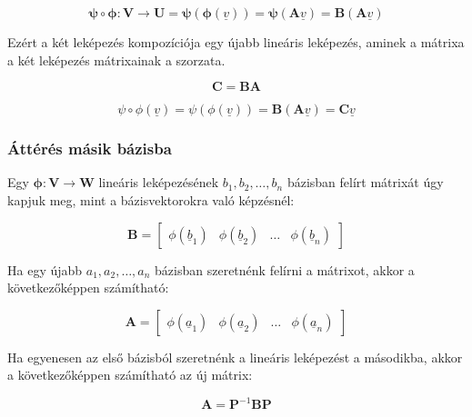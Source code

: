 \documentclass{article}
\begin{document}
\begin{equation*}
    \mathbf{\psi \circ \phi : V \rightarrow U} = \mathbf{\psi}(\mathbf{\phi}(\underline{v})) = \mathbf{\psi}(\mathbf{A}\underline{v}) = \mathbf{B}(\mathbf{A}\underline{v})
\end{equation*}

Ezért a két leképezés kompozíciója egy újabb lineáris leképezés, aminek a mátrixa a két leképezés mátrixainak a szorzata.

\begin{equation*}
    \mathbf{C} = \mathbf{B}\mathbf{A}
\end{equation*}

\begin{equation*}
    \psi \circ \phi(\underline{v}) = \psi(\phi(\underline{v})) = \mathbf{B}(\mathbf{A}\underline{v}) = \mathbf{C}\underline{v}  
\end{equation*}

\subsubsection{Áttérés másik bázisba}

Egy $\mathbf{\phi : V \rightarrow W}$ lineáris leképezésének $b_1,b_2,\ldots,b_n$ bázisban felírt mátrixát úgy kapjuk meg, mint a bázisvektorokra való képzésnél:

\begin{equation*}
    \mathbf{B} = \begin{bmatrix} \phi(\underline{b}_1) & \phi(\underline{b}_2) & \ldots & \phi(\underline{b}_n) \end{bmatrix}
\end{equation*}

Ha egy újabb $a_1, a_2, \ldots, a_n$ bázisban szeretnénk felírni a mátrixot, akkor a következőképpen számítható:

\begin{equation*}
    \mathbf{A} = \begin{bmatrix} \phi(\underline{a}_1) & \phi(\underline{a}_2) & \ldots & \phi(\underline{a}_n) \end{bmatrix}
\end{equation*}

Ha egyenesen az első bázisból szeretnénk a lineáris leképezést a másodikba, akkor a kö\-vet\-kez\-ő\-kép\-pen szá\-mít\-hat\-ó az új mátrix:

\begin{equation*}
    \mathbf{A} = \mathbf{P}^{-1}\mathbf{B}\mathbf{P}
\end{equation*}
\end{document}
